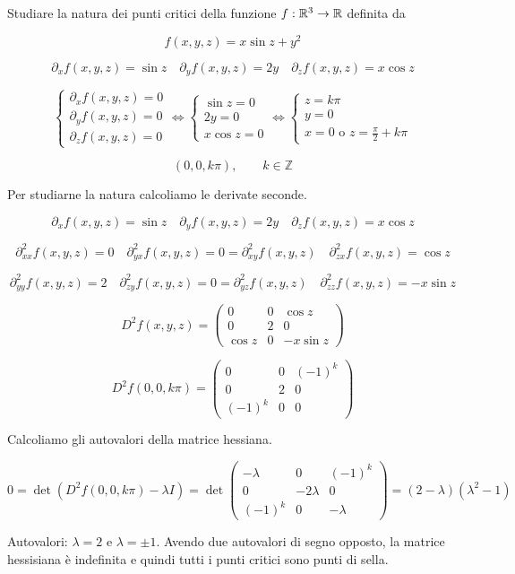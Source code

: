 \begin{exbar}
\begin{example}
	Studiare la natura dei punti critici della funzione $f: \mathbb{R}^3 \rightarrow \mathbb{R}$ definita da 
	
	$$f(x,y,z)=x\sin z + y^2$$
	
	$$\partial_x f(x,y,z)=\sin z \quad \partial_y f(x,y,z)=2y \quad \partial_z f(x,y,z)=x \cos z$$
	
	$$\begin{cases}
		\partial_x f(x,y,z)=0\\
		\partial_y f(x,y,z)=0\\
		\partial_z f(x,y,z)=0
	\end{cases}\Leftrightarrow
	\begin{cases}
		\sin z=0\\
		2y=0\\
		x\cos z=0
	\end{cases}\Leftrightarrow
	\begin{cases}
		z=k\pi\\
		y=0\\
		x=0 \text{  o  } z=\frac{\pi}{2}+k\pi
	\end{cases}$$
	
	$$(0,0,k\pi), \qquad k \in \mathbb{Z}$$
	
	Per studiarne la natura calcoliamo le derivate seconde.
	
	$$\partial_x f(x,y,z)=\sin z \quad \partial_y f(x,y,z)=2y \quad \partial_z f(x,y,z)=x \cos z$$
	
	$$\partial_{xx}^2f(x,y,z)=0 \quad \partial_{yx}^2f(x,y,z)=0=\partial_{xy}^2f(x,y,z) \quad \partial_{zx}^2f(x,y,z)=\cos z$$
	
	$$\partial_{yy}^2f(x,y,z)=2 \quad \partial_{zy}^2f(x,y,z)=0=\partial_{yz}^2f(x,y,z) \quad \partial_{zz}^2f(x,y,z)=-x \sin z$$
	
	$$D^2f(x,y,z)=\begin{pmatrix}
		0&0&\cos z\\
		0&2&0\\
		\cos z&0&-x \sin z
	\end{pmatrix}$$
	
	$$D^2f(0,0,k\pi)=\begin{pmatrix}
		0&0&(-1)^k\\
		0&2&0\\
		(-1)^k&0&0
	\end{pmatrix}$$
	
	Calcoliamo gli autovalori della matrice hessiana.
	
	$0=\det(D^2 f(0,0,k\pi)-\lambda I)= 
	\det\begin{pmatrix}
		-\lambda&0&(-1)^k\\
		0&-2\lambda&0\\
		(-1)^k&0&-\lambda
	\end{pmatrix}=(2-\lambda)(\lambda^2-1)$
	
	Autovalori: $\lambda=2$ e $\lambda= \pm 1$. Avendo due autovalori di segno opposto, la matrice hessisiana è indefinita e quindi tutti i punti critici sono punti di sella.
\end{example}
\end{exbar}


